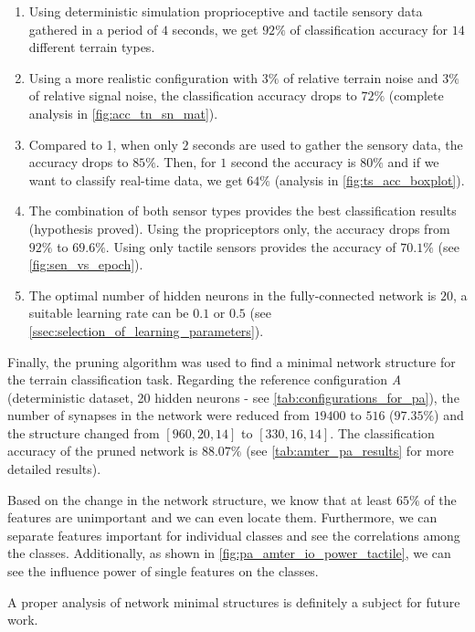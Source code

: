 \begin{enumerate}
\item Using deterministic simulation proprioceptive and tactile sensory data gathered in a period of $ 4 $ seconds, we get $ 92\% $ of classification accuracy for $ 14 $ different terrain types.
\item Using a more realistic configuration with $ 3\% $ of relative terrain noise and $ 3\% $ of relative signal noise, the classification accuracy drops to $ 72\% $ (complete analysis in \cref{fig:acc_tn_sn_mat}).
\item Compared to 1, when only $ 2 $ seconds are used to gather the sensory data, the accuracy drops to $ 85\% $. Then, for $ 1 $ second the accuracy is $ 80\% $ and if we want to classify real-time data, we get $ 64\% $ (analysis in \cref{fig:ts_acc_boxplot}).
\item The combination of both sensor types provides the best classification results (hypothesis proved). Using the propriceptors only, the accuracy drops from $ 92\% $ to $69.6\%$. Using only tactile sensors provides the accuracy of $ 70.1\% $ (see \cref{fig:sen_vs_epoch}).
\item The optimal number of hidden neurons in the fully-connected network is $ 20 $, a suitable learning rate can be $ 0.1 $ or $ 0.5 $ (see \cref{ssec:selection_of_learning_parameters}).
\end{enumerate}

Finally, the pruning algorithm was used to find a minimal network structure for the terrain classification task. Regarding the reference configuration \textit{A} (deterministic dataset, 20 hidden neurons - see \ref{tab:configurations_for_pa}), the number of synapses in the network were reduced from $ 19400 $ to $ 516 $ ($ 97.35\% $) and the structure changed from $ [960, 20, 14] $ to $ [330, 16, 14] $. The classification accuracy of the pruned network is $ 88.07\% $ (see \cref{tab:amter_pa_results} for more detailed results).

Based on the change in the network structure, we know that at least $ 65\% $ of the features are unimportant and we can even locate them. Furthermore, we can separate features important for individual classes and see the correlations among the classes. Additionally, as shown in \cref{fig:pa_amter_io_power_tactile}, we can see the influence power of single features on the classes.

A proper analysis of network minimal structures is definitely a subject for future work.


